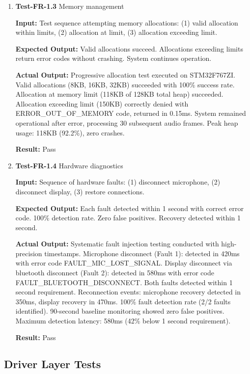 \documentclass[12pt, titlepage]{article}
\begin{document}
\begin{enumerate}
\item{\textbf{Test-FR-1.3} Memory management \\}

\textbf{Input:}
Test sequence attempting memory allocations: (1) valid allocation within limits,
 (2) allocation at limit, (3) allocation exceeding limit.

\textbf{Expected Output:}
Valid allocations succeed. Allocations exceeding limits return error codes
without crashing. System continues operation.

\textbf{Actual Output:}
Progressive allocation test executed on STM32F767ZI. Valid allocations (8KB,
16KB, 32KB) succeeded with 100\% success rate. Allocation at memory limit (118KB
of 128KB total heap) succeeded. Allocation exceeding limit (150KB) correctly
denied with ERROR\_OUT\_OF\_MEMORY code, returned in 0.15ms. System remained
operational after error, processing 30 subsequent audio frames. Peak heap usage:
118KB (92.2\%), zero crashes.

\textbf{Result:} Pass

\item{\textbf{Test-FR-1.4} Hardware diagnostics \\}

\textbf{Input:}
Sequence of hardware faults: (1) disconnect microphone, (2) disconnect display,
(3) restore connections.

\textbf{Expected Output:}
Each fault detected within 1 second with correct error code. 100\% detection
rate. Zero false positives. Recovery detected within 1 second.

\textbf{Actual Output:}
Systematic fault injection testing conducted with high-precision timestamps.
Microphone disconnect (Fault 1): detected in 420ms with error code
FAULT\_MIC\_LOST\_SIGNAL. Display disconnect via bluetooth disconnect
(Fault 2): detected in 580ms with error code FAULT\_BLUETOOTH\_DISCONNECT. Both
faults detected within 1 second requirement. Reconnection events: microphone
recovery detected in 350ms, display
recovery in 470ms. 100\% fault detection rate (2/2 faults identified). 90-second
baseline monitoring showed zero false positives. Maximum detection latency:
580ms (42\% below 1 second requirement).

\textbf{Result:} Pass

\end{enumerate}

\subsection{Driver Layer Tests}
\end{document}

